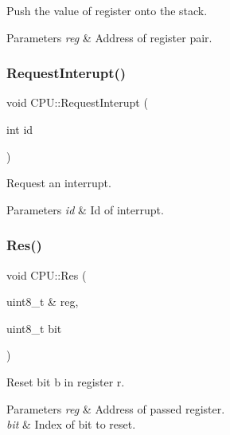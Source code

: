 Push the value of register onto the stack. 


\begin{DoxyParams}{Parameters}
{\em reg} & Address of register pair. \\
\hline
\end{DoxyParams}
\mbox{\label{classCPU_ad65b0c4a4b9db9d040ddd22f8eb0bd08}} 
\subsubsection{\texorpdfstring{Request\+Interupt()}{RequestInterupt()}}
{\footnotesize\ttfamily void C\+P\+U\+::\+Request\+Interupt (\begin{DoxyParamCaption}\item[{int}]{id }\end{DoxyParamCaption})}



Request an interrupt. 


\begin{DoxyParams}{Parameters}
{\em id} & Id of interrupt. \\
\hline
\end{DoxyParams}
\mbox{\label{classCPU_a4a15466d458acbff3c7e81241b64ca76}} 
\subsubsection{\texorpdfstring{Res()}{Res()}}
{\footnotesize\ttfamily void C\+P\+U\+::\+Res (\begin{DoxyParamCaption}\item[{uint8\+\_\+t \&}]{reg,  }\item[{uint8\+\_\+t}]{bit }\end{DoxyParamCaption})\hspace{0.3cm}{\ttfamily [private]}}



Reset bit b in register r. 


\begin{DoxyParams}{Parameters}
{\em reg} & Address of passed register. \\
\hline
{\em bit} & Index of bit to reset. \\
\hline
\end{DoxyParams}
\mbox{\label{classCPU_a0b842b14ba5be5f72602193c56538b65}} 
